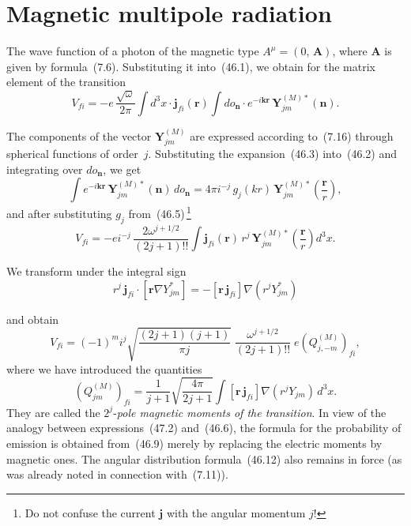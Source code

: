 \section{Magnetic multipole radiation}

The wave function of a photon of the magnetic type $A^\mu = (0,\,\mathbf{A})$, where $\mathbf{A}$ is given by formula~(7.6). Substituting it into~(46.1), we obtain for the matrix element of the transition
\begin{equation}
V_{fi} = -e\,\frac{\sqrt{\omega}}{2\pi}\int d^3x\cdot\mathbf{j}_{fi}(\mathbf{r})\int do_\mathbf{n}\cdot e^{-i\mathbf{k}\mathbf{r}}\,\mathbf{Y}^{(M)*}_{jm}(\mathbf{n}).
\tag{47.1}
\end{equation}

The components of the vector $\mathbf{Y}^{(M)}_{jm}$ are expressed according to~(7.16) through spherical functions of order~$j$. Substituting the expansion~(46.3) into~(46.2) and integrating over $do_\mathbf{n}$, we get
\[
\int e^{-i\mathbf{k}\mathbf{r}}\,\mathbf{Y}^{(M)*}_{jm}(\mathbf{n})\,do_\mathbf{n} = 4\pi i^{-j}\,g_j(kr)\,\mathbf{Y}^{(M)*}_{jm}\!\left(\frac{\mathbf{r}}{r}\right),
\]
and after substituting $g_j$ from~(46.5)\,\footnote{Do not confuse the current $\mathbf{j}$ with the angular momentum $j$!}
\begin{equation}
V_{fi} = -ei^{-j}\,\frac{2\omega^{j+1/2}}{(2j+1)!!}\int\mathbf{j}_{fi}(\mathbf{r})\,r^j\,\mathbf{Y}^{(M)*}_{jm}\!\left(\frac{\mathbf{r}}{r}\right)d^3x.
\end{equation}

We transform under the integral sign
\[
r^j\,\mathbf{j}_{fi}\cdot[\mathbf{r}\nabla Y^*_{jm}] = -[\mathbf{r}\,\mathbf{j}_{fi}]\nabla(r^j Y^*_{jm})
\]

and obtain
\begin{equation}
V_{fi} = (-1)^m i^j\sqrt{\frac{(2j+1)(j+1)}{\pi j}}\;\frac{\omega^{j+1/2}}{(2j+1)!!}\;e(Q^{(M)}_{j,-m})_{fi},
\tag{47.2}
\end{equation}
where we have introduced the quantities
\begin{equation}
(Q^{(M)}_{jm})_{fi} = \frac{1}{j+1}\sqrt{\frac{4\pi}{2j+1}}\int[\mathbf{r}\,\mathbf{j}_{fi}]\nabla(r^j Y_{jm})\,d^3x.
\tag{47.3}
\end{equation}
They are called the $2^j$-\textit{pole magnetic moments of the transition}. In view of the analogy between expressions~(47.2) and~(46.6), the formula for the probability of emission is obtained from~(46.9) merely by replacing the electric moments by magnetic ones. The angular distribution formula~(46.12) also remains in force (as was already noted in connection with~(7.11)).

